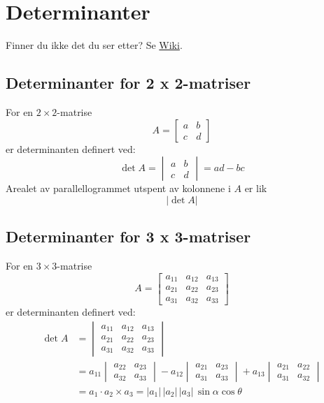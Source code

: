 \documentclass{article}
\begin{document}
\clearpage
\section{Determinanter}
Finner du ikke det du ser etter? Se \href{https://www.math.ntnu.no/emner/TMA4110/2020h/notater/6-determinanter.pdf}{Wiki}.


\subsection{Determinanter for 2 x 2-matriser}
For en $2 \times 2$-matrise
\[ A = \begin{bmatrix} a & b \\ c & d \end{bmatrix} \]
er determinanten definert ved:
\[ \det{A} = \begin{vmatrix} a & b \\ c & d \end{vmatrix} = ad - bc \]
Arealet av parallellogrammet utspent av kolonnene i $A$ er lik
\[ | \det{A} | \]


\subsection{Determinanter for 3 x 3-matriser}
For en $3 \times 3$-matrise
\[ A =
\begin{bmatrix}
a_{11} & a_{12} & a_{13} \\
a_{21} & a_{22} & a_{23} \\
a_{31} & a_{32} & a_{33}
\end{bmatrix} \]
er determinanten definert ved:
\begin{align*}
    \det{A} &=
    \begin{vmatrix}
    a_{11} & a_{12} & a_{13} \\
    a_{21} & a_{22} & a_{23} \\
    a_{31} & a_{32} & a_{33}
    \end{vmatrix} \\
    &= a_{11}\begin{vmatrix} a_{22} & a_{23} \\ a_{32} & a_{33} \end{vmatrix}
    - a_{12}\begin{vmatrix} a_{21} & a_{23} \\ a_{31} & a_{33} \end{vmatrix}
    + a_{13}\begin{vmatrix} a_{21} & a_{22} \\ a_{31} & a_{32} \end{vmatrix}\\
    &= a_1 \cdot a_2 \times a_3 = |a_1|\,|a_2|\,|a_3|\,\sin{\alpha}\cos{\theta}
\end{align*}
\end{document}
